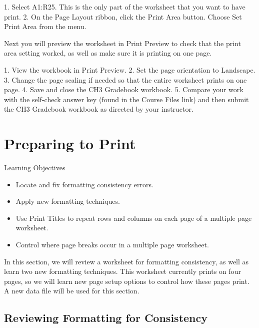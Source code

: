 1. Select A1:R25. This is the only part of the worksheet that you want to have print.
2. On the Page Layout ribbon, click the Print Area button. Choose Set Print Area from the menu.

Next you will preview the worksheet in Print Preview to check that the print area setting worked, as
well as make sure it is printing on one page.

1.   View the workbook in Print Preview.
2.   Set the page orientation to Landscape.
3.   Change the page scaling if needed so that the entire worksheet prints on one page.
4.   Save and close the CH3 Gradebook workbook.
5.   Compare your work with the self-check answer key (found in the Course Files link) and then
submit the CH3 Gradebook workbook as directed by your instructor.









\section{Preparing to Print}

\begin{center}
	\begin{objbox}{Learning Objectives}
		\begin{itemize}
			\setlength{\itemsep}{0pt}
			\setlength{\parskip}{0pt}
			\setlength{\parsep}{0pt}

			\item Locate and fix formatting consistency errors.
			\item Apply new formatting techniques.
			\item Use Print Titles to repeat rows and columns on each page of a multiple page worksheet.
			\item Control where page breaks occur in a multiple page worksheet.
			
		\end{itemize}
	\end{objbox}
\end{center}



In this section, we will review a worksheet for formatting consistency, as well as learn two new
formatting techniques. This worksheet currently prints on four pages, so we will learn new page setup
options to control how these pages print. A new data file will be used for this section.

\subsection{Reviewing Formatting for Consistency}

